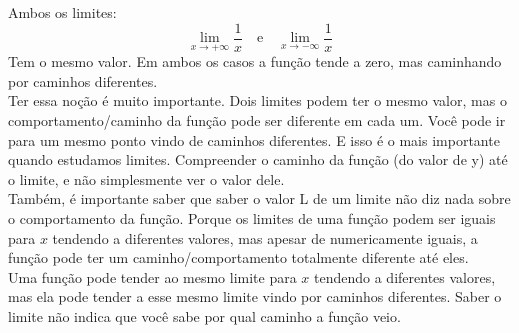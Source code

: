 \documentclass{article}
\begin{document}
\begin{center}
\end{center}
Ambos os limites:
\[
\lim_{x\to+\infty}\frac{1}{x} \quad \text{e} \quad \lim_{x\to-\infty}\frac{1}{x}
\]
Tem o mesmo valor. Em ambos os casos a função tende a zero, mas caminhando por caminhos diferentes.
\\[2pt]
Ter essa noção é muito importante. Dois limites podem ter o mesmo valor, mas o comportamento/caminho da função pode ser diferente em cada um. Você pode ir para um mesmo ponto vindo de caminhos diferentes. E isso é o mais importante quando estudamos limites. Compreender o caminho da função (do valor de y) até o limite, e não simplesmente ver o valor dele. 
\\[2pt]
Também, é importante saber que saber o valor L de um limite não diz nada sobre o comportamento da função. Porque os limites de uma função podem ser iguais para $x$ tendendo a diferentes valores, mas apesar de numericamente iguais, a função pode ter um caminho/comportamento totalmente diferente até eles.
\\[2pt]
Uma função pode tender ao mesmo limite para $x$ tendendo a diferentes valores, mas ela pode tender a esse mesmo limite vindo por caminhos diferentes. Saber o limite não indica que você sabe por qual caminho a função veio.
\end{document}
